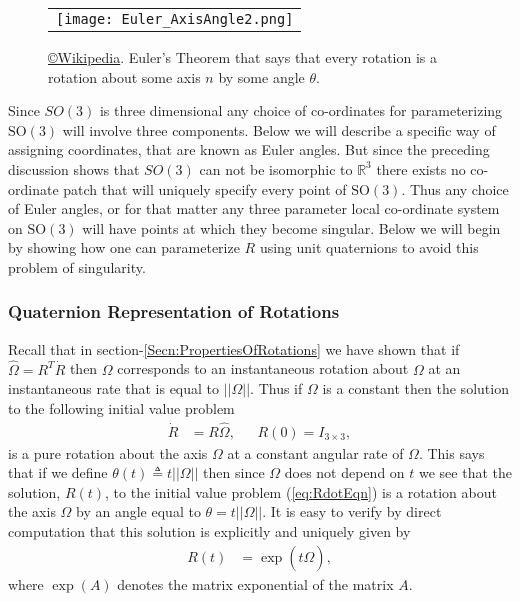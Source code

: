 \documentclass[graybox,envcountchap,sectrefs]{svmonoMuga}
\begin{document}
\begin{figure}[ht]
\begin{center}
\begin{tabular}{c}
\texttt{[image: Euler\_AxisAngle2.png]} 
\end{tabular}
\renewcommand{\baselinestretch}{1}\selectfont
\caption{\href{https://commons.wikimedia.org/wiki/File:Euler_AxisAngle.svg}{\copyright Wikipedia}. Euler's Theorem that says that every rotation is a rotation about some axis $n$ by some angle $\theta$.}
\label{Fig:EulersTheorem}
\renewcommand{\baselinestretch}{1.5}\selectfont
\end{center}
\end{figure}


Since $SO(3)$ is three dimensional any choice of co-ordinates for parameterizing $\mathrm{SO}(3)$ will involve three components. Below we will describe a specific way of assigning coordinates, that are known as Euler angles. But since the preceding discussion shows that $SO(3)$ can not be isomorphic to $\mathbb{R}^3$ there exists no co-ordinate patch that will uniquely specify every point of $\mathrm{SO}(3)$. Thus any choice of Euler angles, or for that matter any three parameter local co-ordinate system on $\mathrm{SO}(3)$ will have points at which they become singular. Below we will begin by showing how one can parameterize $R$ using unit quaternions to avoid this problem of singularity.


\subsubsection{Quaternion Representation of Rotations}\label{Secn:Quaternion}
Recall that in section-\ref{Secn:PropertiesOfRotations} we have shown that if $\widehat{\Omega}=R^T\dot{R}$ then $\Omega$ corresponds to an instantaneous rotation about $\Omega$ at an instantaneous rate that is equal to $||\Omega||$. Thus if $\Omega$ is a constant then the solution to the following initial value problem 
\begin{align}
\dot{R}&=R\widehat{\Omega},\:\:\:\:\:\:\: R(0)=I_{3\times 3},\label{eq:RdotEqn}
\end{align}
is a pure rotation about the axis $\Omega$ at a constant angular rate of $\Omega$. 
This says that if we define $\theta(t)\triangleq t||\Omega||$ then since $\Omega$ does not depend on $t$ we see that the solution, $R(t)$, to the initial value problem (\ref{eq:RdotEqn}) is a rotation about the axis $\Omega$ by an angle equal to $\theta=t||\Omega||$.
It is easy to verify by direct computation that this solution is explicitly and uniquely given by
\begin{align}
{R}(t)&=\exp{(t\widehat{\Omega})},\label{eq:ExpSoln}
\end{align}
where $\exp{(A)}$ denotes the matrix exponential of the matrix $A$. 
\end{document}
